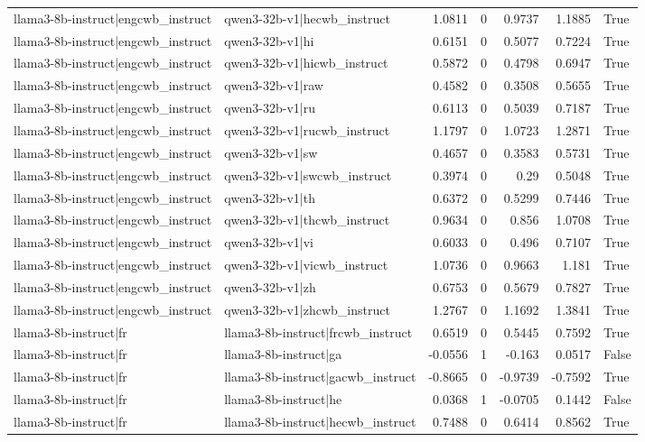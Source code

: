 \begin{table}
\begin{tabular}{l l r r r r l}
llama3-8b-instruct|engcwb_instruct & qwen3-32b-v1|hecwb_instruct & 1.0811 & 0 & 0.9737 & 1.1885 & True \\
llama3-8b-instruct|engcwb_instruct & qwen3-32b-v1|hi & 0.6151 & 0 & 0.5077 & 0.7224 & True \\
llama3-8b-instruct|engcwb_instruct & qwen3-32b-v1|hicwb_instruct & 0.5872 & 0 & 0.4798 & 0.6947 & True \\
llama3-8b-instruct|engcwb_instruct & qwen3-32b-v1|raw & 0.4582 & 0 & 0.3508 & 0.5655 & True \\
llama3-8b-instruct|engcwb_instruct & qwen3-32b-v1|ru & 0.6113 & 0 & 0.5039 & 0.7187 & True \\
llama3-8b-instruct|engcwb_instruct & qwen3-32b-v1|rucwb_instruct & 1.1797 & 0 & 1.0723 & 1.2871 & True \\
llama3-8b-instruct|engcwb_instruct & qwen3-32b-v1|sw & 0.4657 & 0 & 0.3583 & 0.5731 & True \\
llama3-8b-instruct|engcwb_instruct & qwen3-32b-v1|swcwb_instruct & 0.3974 & 0 & 0.29 & 0.5048 & True \\
llama3-8b-instruct|engcwb_instruct & qwen3-32b-v1|th & 0.6372 & 0 & 0.5299 & 0.7446 & True \\
llama3-8b-instruct|engcwb_instruct & qwen3-32b-v1|thcwb_instruct & 0.9634 & 0 & 0.856 & 1.0708 & True \\
llama3-8b-instruct|engcwb_instruct & qwen3-32b-v1|vi & 0.6033 & 0 & 0.496 & 0.7107 & True \\
llama3-8b-instruct|engcwb_instruct & qwen3-32b-v1|vicwb_instruct & 1.0736 & 0 & 0.9663 & 1.181 & True \\
llama3-8b-instruct|engcwb_instruct & qwen3-32b-v1|zh & 0.6753 & 0 & 0.5679 & 0.7827 & True \\
llama3-8b-instruct|engcwb_instruct & qwen3-32b-v1|zhcwb_instruct & 1.2767 & 0 & 1.1692 & 1.3841 & True \\
llama3-8b-instruct|fr & llama3-8b-instruct|frcwb_instruct & 0.6519 & 0 & 0.5445 & 0.7592 & True \\
llama3-8b-instruct|fr & llama3-8b-instruct|ga & -0.0556 & 1 & -0.163 & 0.0517 & False \\
llama3-8b-instruct|fr & llama3-8b-instruct|gacwb_instruct & -0.8665 & 0 & -0.9739 & -0.7592 & True \\
llama3-8b-instruct|fr & llama3-8b-instruct|he & 0.0368 & 1 & -0.0705 & 0.1442 & False \\
llama3-8b-instruct|fr & llama3-8b-instruct|hecwb_instruct & 0.7488 & 0 & 0.6414 & 0.8562 & True \\

\end{tabular}
\end{table}
